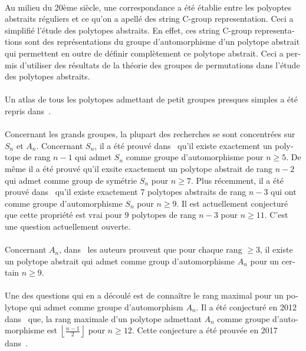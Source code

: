 \begin{otherlanguage}{french}
\paragraph{}
Au milieu du 20ème siècle, une correspondance a été établie entre les polyoptes abstraits réguliers et ce qu'on a apellé des string C-group representation. Ceci a simplifié l'étude des polytopes abstraits. En effet, ces string C-group representations sont des représentations du groupe d'automorphisme d'un polytope abstrait qui permettent en outre de définir complètement ce polytope abstrait. Ceci a permis d'utiliser des résultats de la théorie des groupes de permutations dans l'étude des polytopes abstraits.

\paragraph{}
Un atlas de tous les polytopes admettant de petit groupes presques simples a été repris dans~\cite{atlasPolytopes}.

\paragraph{}
Concernant les grands groupes, la plupart des recherches se sont concentrées sur $S_n$ et $A_n$. Concernant $S_n$, il a été prouvé dans~\cite{highRankSym} qu'il existe exactement un polytope de rang $n-1$ qui admet $S_n$ comme groupe d'automorphisme pour $n \ge 5$. De même il a été prouvé qu'il exsite exactement un polytope abstrait de rang $n-2$ qui admet comme group de symétrie $S_n$ pour $n \ge 7$. Plus récemment, il a été prouvé dans~\cite{leemansTransactions} qu'il existe exactement 7 polytopes abstraits de rang $n-3$ qui ont comme groupe d'automorphisme $S_n$ pour $n \ge 9$. Il est actuellement conjecturé que cette propriété est vrai pour 9 polytopes de rang $n-3$ pour $n \ge 11$. C'est une question actuellement ouverte.

\paragraph{}
Concernant $A_n$, dans~\cite{highRankAlternating} les auteurs prouvent que pour chaque rang $\ge 3$, il existe un polytope abstrait qui admet comme group d'automorphisme $A_n$ pour un certain $n \ge 9$.

\paragraph{}
Une des questions qui en a découlé est de connaître le rang maximal pour un polytope qui admet comme groupe d'automorphism $A_n$. Il a été conjecturé en 2012 dans~\cite{A12PolytopesRank} que, la rang maximale d'un polytope admettant $A_n$ comme groupe d'automorphisme est $\left\lfloor\frac{n-1}{2}\right\rfloor$ pour $n \ge 12$. Cette conjecture a été prouvée en 2017 dans~\cite{highestRankOfAn}.


\end{otherlanguage}
